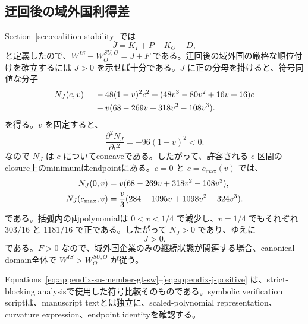 \subsection{迂回後の域外国利得差}
\label{app:j-positive}

Section~\ref{sec:coalition-stability} では
\[
J=K_I+P-K_O-D,
\]
と定義したので、$W^{IS}-W_O^{SU,O}=J+F$ である。迂回後の域外国の厳格な順位付けを確立するには $J>0$ を示せば十分である。$J$ に正の分母を掛けると、符号同値な分子
\begin{align}
N_J(c,v)
={}&-48(1-v)^2c^2
+(48v^3-80v^2+16v+16)c\notag\\
&+v(68-269v+318v^2-108v^3).
\label{eq:appendix-j-numerator}
\end{align}
を得る。$v$ を固定すると、
\[
\frac{\partial^2N_J}{\partial c^2}=-96(1-v)^2<0.
\]
なので $N_J$ は $c$ についてconcaveである。したがって、許容される $c$ 区間のclosure上のminimumはendpointにある。$c=0$ と $c=c_{\max}(v)$ では、
\begin{align}
N_J(0,v)
&=v(68-269v+318v^2-108v^3),\notag\\
N_J(c_{\max},v)
&=\frac v3(284-1095v+1098v^2-324v^3).
\label{eq:appendix-j-endpoints}
\end{align}
である。括弧内の両polynomialは $0<v<1/4$ で減少し、$v=1/4$ でもそれぞれ $303/16$ と $1181/16$ で正である。したがって $N_J>0$ であり、ゆえに
\begin{equation}
\boxed{J>0.}
\label{eq:appendix-j-positive}
\end{equation}
である。$F>0$ なので、域外国企業のみの継続状態が関連する場合、canonical domain全体で $W^{IS}>W_O^{SU,O}$ が従う。

Equations~\eqref{eq:appendix-su-member-gt-sw}--\eqref{eq:appendix-j-positive} は、strict-blocking analysisで使用した符号比較そのものである。symbolic verification scriptは、manuscript textとは独立に、scaled-polynomial representation、curvature expression、endpoint identityを確認する。
